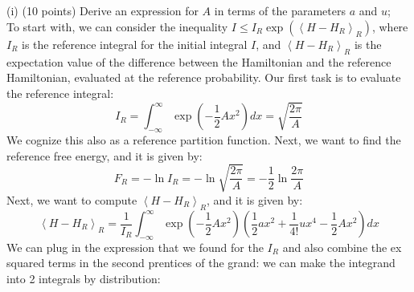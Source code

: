 \documentclass[12pt]{article}
\begin{document}
\subsection{}
(i) (10 points) Derive an expression for $A$ in terms of the parameters $a$ and $u$;\\
To start with, we can consider the inequality $I \leq I_R \exp \left(\left\langle H-H_R\right\rangle_R\right)$, where $I_R$ is the reference integral for the initial integral $I$, and $\left\langle H-H_R\right\rangle_R$ is the expectation value of the difference between the Hamiltonian and the reference Hamiltonian, evaluated at the reference probability. Our first task is to evaluate the reference integral:
\begin{equation}
I_R=\int_{-\infty}^{\infty} \exp \left(-\frac{1}{2} A x^2\right) d x=\sqrt{\frac{2 \pi}{A}}
\end{equation}
We cognize this also as a reference partition function.
Next, we want to find the reference free energy, and it is given by:
\begin{equation}
F_R=-\ln I_R=-\ln \sqrt{\frac{2 \pi}{A}}=-\frac{1}{2} \ln \frac{2 \pi}{A}
\end{equation}
Next, we want to compute $\left\langle H-H_R\right\rangle_R$, and it is given by:
\begin{equation}
\left\langle H-H_R\right\rangle_R=\frac{1}{I_R} \int_{-\infty}^{\infty} \exp \left(-\frac{1}{2} A x^2\right) \left(\frac{1}{2} a x^2+\frac{1}{4 !} u x^4-\frac{1}{2} A x^2\right) d x
\end{equation}
We can plug in the expression that we found for the $I_R$ and also combine the ex squared terms in the second prentices of the grand:
we can make the integrand into 2 integrals by distribution:
\end{document}
